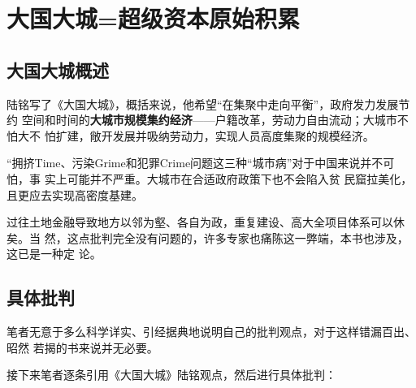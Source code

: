 \begin{quotation}
\end{quotation}

\section{大国大城=超级资本原始积累}

\subsection{大国大城概述}

陆铭写了《大国大城》，概括来说，他希望“在集聚中走向平衡”，政府发力发展节约
空间和时间的\textbf{大城市规模集约经济}——户籍改革，劳动力自由流动；大城市不怕大不
怕扩建，敞开发展并吸纳劳动力，实现人员高度集聚的规模经济。

“拥挤Time、污染Grime和犯罪Crime问题这三种“城市病”对于中国来说并不可怕，事
实上可能并不严重。大城市在合适政府政策下也不会陷入贫
民窟拉美化，且更应去实现高密度基建。

过往土地金融导致地方以邻为壑、各自为政，重复建设、高大全项目体系可以休矣。当
然，这点批判完全没有问题的，许多专家也痛陈这一弊端，本书也涉及，这已是一种定
论。

\subsection{具体批判}

笔者无意于多么科学详实、引经据典地说明自己的批判观点，对于这样错漏百出、昭然
若揭的书来说并无必要。

接下来笔者逐条引用《大国大城》陆铭观点，然后进行具体批判：

